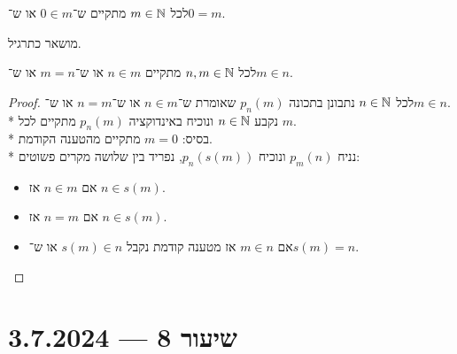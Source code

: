 \begin{proposition}
	לכל $m \in \mathbb{N}$ מתקיים ש־$0 \in m$ או ש־$0 = m$.
\end{proposition}
מושאר כתרגיל.
\begin{proposition}
	לכל $n, m \in \mathbb{N}$ מתקיים $n \in m$ או ש־$m = n$ או ש־$m \in n$.
\end{proposition}
\begin{proof}
	לכל $n \in \mathbb{N}$ נתבונן בתכונה $p_n(m)$ שאומרת ש־$n \in m$ או ש־$n = m$ או ש־$m \in n$. \\*
	נקבע $n \in \mathbb{N}$ ונוכיח באינדוקציה $p_n(m)$ מתקיים לכל $m$. \\*
	בסיס: $m = 0$ מתקיים מהטענה הקודמת. \\*
	נניח $p_m(n)$ ונוכיח $p_n(s(m))$, נפריד בין שלושה מקרים פשוטים:
	\begin{itemize}
		\item אם $n \in m$ אז $n \in s(m)$.
		\item אם $n = m$ אז $n \in s(m)$.
		\item אם $m \in n$ אז מטענה קודמת נקבל $s(m) \in n$ או ש־$s(m) = n$.
	\end{itemize}
\end{proof}

\section{שיעור 8 --- 3.7.2024}
